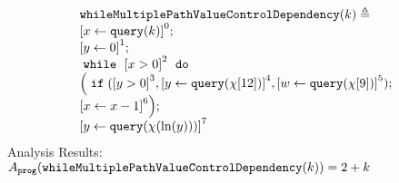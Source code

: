                 \begin{example}
                    \[
                        \begin{array}{l}
                        \kw{whileMultiplePathValueControlDependency}(k) \triangleq\\
                            \clabel{ \assign{x}{\query(k)}}^{0} ; \\
                            \clabel{\assign{y}{0} }^{1} ; \\
                                \ewhile ~ \clabel{x > 0}^{2} ~ \edo ~ \\
                                \Big(
                                 \eif(\clabel{y > 0}^{3}, 
                                 \clabel{\assign{y}{\query(\chi[12])}}^{4}, 
                                 \clabel{\assign{w}{\query(\chi[9])}}^{5});                            
                                 \\
                                 \clabel{\assign{x}{x-1}}^{6}\Big);\\
                                 \clabel{\assign{y}{\query(\chi(\ln(y)))} }^{7} 
                            \end{array}
                        \]
                        Analysis Results: $ A_{\mathtt{prog}}(\mathtt{whileMultiplePathValueControlDependency}(k)) = 2 + k $
                    \end{example}
